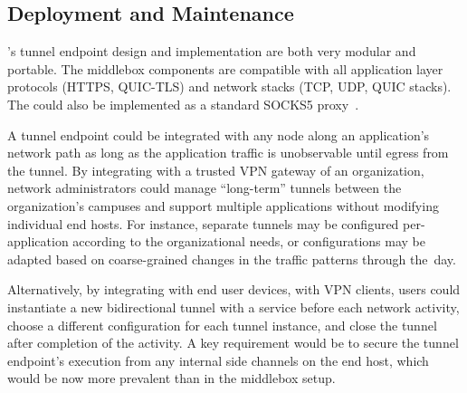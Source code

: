 \subsection{Deployment and Maintenance}
\label{subsec:design-discussion}
{\sys}'s tunnel endpoint design and implementation are both very modular and
portable.
The middlebox components are compatible with all application layer protocols
(\eg HTTPS, QUIC-TLS) and network stacks (\eg TCP, UDP, QUIC stacks).
The {\ushaper} could also be implemented as a standard SOCKS5 proxy~\cite{torpt}.

A tunnel endpoint could be integrated with any node along an application's
network path as long as the application traffic is unobservable until egress
from the tunnel.
%
By integrating with a trusted VPN gateway of an organization,
network administrators could manage ``long-term'' tunnels between the
organization's campuses and support multiple applications without modifying
individual end hosts. For instance, separate tunnels may be configured
per-application according to the organizational needs, or
configurations may be adapted based on coarse-grained changes in the traffic
patterns through the~day.

Alternatively, by integrating with end user devices, \eg with VPN clients,
users could instantiate a new bidirectional tunnel with a service before
each network activity, choose a different configuration for each tunnel
instance, and close the tunnel after completion of the activity. A key
requirement would be to secure the tunnel endpoint's execution from any internal
side channels on the end host, which would be now more prevalent than in the
middlebox setup.

